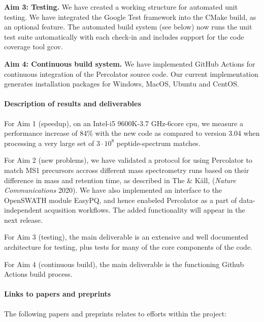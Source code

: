 \documentclass{article}
\begin{document}
{\bf Aim 3: Testing.} We have created a working structure for
automated unit testing. We have integrated the Google Test framework
into the CMake build, as an optional feature. The automated build
system (see below) now runs the unit test suite automatically with
each check-in and includes support for the code coverage tool gcov.

{\bf Aim 4: Continuous build system.} We have implemented GitHub
Actions for continuous integration of the Percolator source code.  Our
current implementation generates installation packages for Windows,
MacOS, Ubuntu and CentOS.


\paragraph{Description of results and deliverables}

For Aim 1 (speedup), on an Intel-i5 9600K-3.7 GHz-6core cpu, we measure a
performance increase of 84\% with the new code as compared to version
3.04 when processing a very large set of $3\cdot10^8$ peptide-spectrum
matches.

For Aim 2 (new problems), we have validated a protocol for using
Percolator to match MS1 precursors accross different mass spectrometry
runs based on their difference in mass and retention time, as
described in The \& K\"{a}ll, ({\em Nature Communications} 2020). We
have also implemented an interface to the OpenSWATH module EasyPQ, and
hence enabeled Percolator as a part of data-independent acqusition
workflows. The added functionality will appear in the next release.

For Aim 3 (testing), the main deliverable is an extensive and well
documented architecture for testing, plus tests for many of the core
components of the code.

For Aim 4 (continuous build), the main deliverable is the functioning
Github Actions build process.

\paragraph{Links to papers and preprints}
The following papers and preprints relates to efforts within the project:
\end{document}
